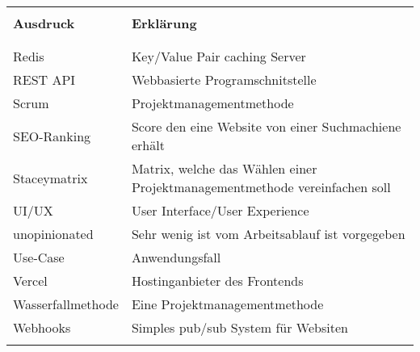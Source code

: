 \begin{table}[H]
  \begin{tabularx}{\textwidth}{l X}\hline \\
  \textbf{Ausdruck} & \textbf{Erklärung}  \\ \\\hline \\
  Redis & Key/Value Pair caching Server \\
  REST API & Webbasierte Programschnitstelle \\
  Scrum & Projektmanagementmethode \\
  SEO-Ranking & Score den eine Website von einer Suchmachiene erhält \\
  Staceymatrix & Matrix, welche das Wählen einer Projektmanagementmethode vereinfachen soll \\
  UI/UX & User Interface/User Experience \\
  unopinionated & Sehr wenig ist vom Arbeitsablauf ist vorgegeben \\
  Use-Case & Anwendungsfall \\
  Vercel & Hostinganbieter des Frontends \\
  Wasserfallmethode & Eine Projektmanagementmethode \\
  Webhooks & Simples pub/sub System für Websiten \\
  \\\hline
  \end{tabularx}
\end{table}